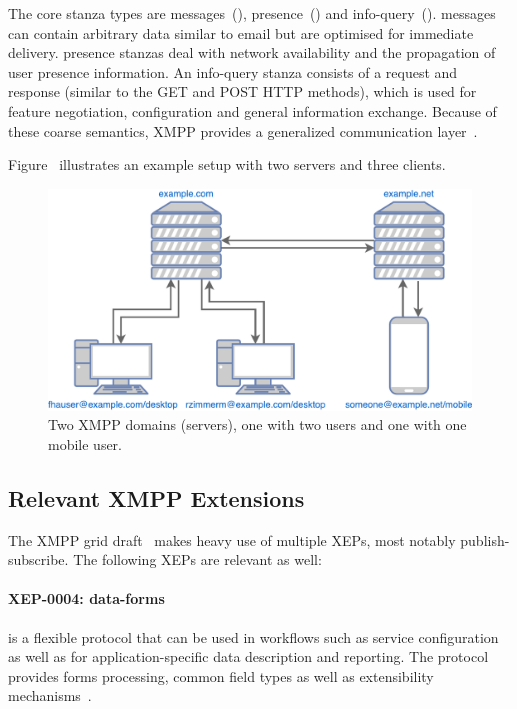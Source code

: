 The core \gls{stanza} types are \glspl{message}~(), \gls{presence}~() and \gls{info-query}~().
\Glspl{message} can contain arbitrary data similar to email but are optimised for immediate delivery.
\Gls{presence} \glspl{stanza} deal with network availability and the propagation of user presence information.
An \gls{info-query} \gls{stanza} consists of a request and response (similar to the GET and POST HTTP methods), which is used for feature negotiation, configuration and general information exchange.
Because of these coarse semantics, XMPP provides a generalized communication layer~\cite{rfc6120}\cite{ieee-xplore-stream-xml-xmpp}.

Figure~ illustrates an example setup with two servers and three clients.

\begin{figure}[h]
	\centering
	\includegraphics[width=0.8\linewidth]{resources/xmpp_overview.pdf}
	\caption{Two XMPP domains (servers), one with two users and one with one mobile user.}
	\label{fig:xmpp-overview}
\end{figure}

\subsection{Relevant XMPP Extensions}

The XMPP grid draft~\cite{ietf-mile-xmpp-grid-05} makes heavy use of multiple XEPs, most notably \gls{publish-subscribe}. The following XEPs are relevant as well:

\paragraph{XEP-0004: \gls{data-forms}} is a flexible protocol that can be used in workflows such as service configuration as well as for application-specific data description and reporting. The protocol provides forms processing, common field types as well as extensibility mechanisms~\cite{xep-0004}.

